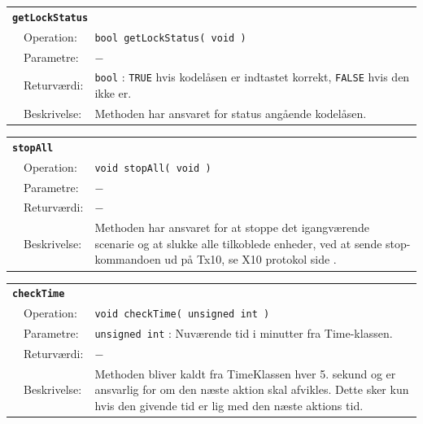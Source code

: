 \begin{table}[h]
\begin{tabularx}{\textwidth}{p{0.6 cm} l X} %
\multicolumn{3}{l}{\textbf{\texttt{getLockStatus}}}\\
& Operation: &
\texttt{bool getLockStatus( void )}
\\ & Parametre: & %
$-$
\\ & Returværdi: & %
\texttt{bool} : \texttt{TRUE} hvis kodelåsen er indtastet korrekt, \texttt{FALSE} hvis den ikke er.
\\ & Beskrivelse: & %
Methoden har ansvaret for status angående kodelåsen.
\\ \end{tabularx}
\end{table}

\clearpage

\begin{table}[h]
\begin{tabularx}{\textwidth}{p{0.6 cm} l X} %
\multicolumn{3}{l}{\textbf{\texttt{stopAll}}}\\
& Operation: &
\texttt{void stopAll( void )}
\\ & Parametre: & %
$-$
\\ & Returværdi: & %
$-$
\\ & Beskrivelse: & %
Methoden har ansvaret for at stoppe det igangværende scenarie og at slukke alle tilkoblede enheder, ved at sende stop-kommandoen ud på Tx10, se X10 protokol side \pageref{prot_x10}.
\\ \end{tabularx}
\end{table}

\begin{table}[h]
\begin{tabularx}{\textwidth}{p{0.6 cm} l X} %
\multicolumn{3}{l}{\textbf{\texttt{checkTime}}}\\
& Operation: &
\texttt{void checkTime( unsigned int )}
\\ & Parametre: & %
\texttt{unsigned int} : Nuværende tid i minutter fra Time-klassen.
\\ & Returværdi: & %
$-$
\\ & Beskrivelse: & %
Methoden bliver kaldt fra TimeKlassen hver 5. sekund og er ansvarlig for om den næste aktion skal afvikles. Dette sker kun hvis den givende tid er lig med den næste aktions tid.
\\ \end{tabularx}
\end{table}



